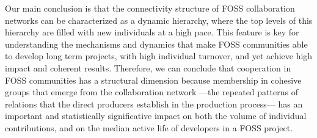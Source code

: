 Our main conclusion is that the connectivity structure of FOSS collaboration networks can be characterized as a dynamic hierarchy, where the top levels of this hierarchy are filled with new individuals at a high pace. This feature is key for understanding the mechanisms and dynamics that make FOSS communities able to develop long term projects, with high individual turnover, and yet achieve high impact and coherent results. Therefore, we can conclude that cooperation in FOSS communities has a structural dimension because membership in cohesive groups that emerge from the collaboration network ---the repeated patterns of relations that the direct producers establish in the production process--- has an important and statistically significative impact on both the volume of individual contributions, and on the median active life of developers in a FOSS project.
